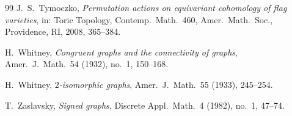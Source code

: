 \documentclass[11pt,a4paper]{article}
\numberwithin{equation}{section}
\theoremstyle{plain}
\theoremstyle{definition}
\theoremstyle{remark}
\begin{document}
\begin{thebibliography}{99}
 J.~S.~Tymoczko, \emph{Permutation actions on equivariant cohomology of flag varieties}, in: Toric Topology, Contemp.\ Math.\ 460, Amer.\ Math.\ Soc., Providence, RI, 2008, 365--384.

 H.~Whitney, \emph{Congruent graphs and the connectivity of graphs}, Amer.\ J.\ Math.\ 54 (1932), no.~1, 150--168.

 H.~Whitney, \emph{$2$-isomorphic graphs}, Amer.\ J.\ Math.\ 55 (1933), 245--254.

 T.~Zaslavsky, \emph{Signed graphs}, Discrete Appl.\ Math.\ 4 (1982), no.~1, 47--74.

\end{thebibliography}
\end{document}
